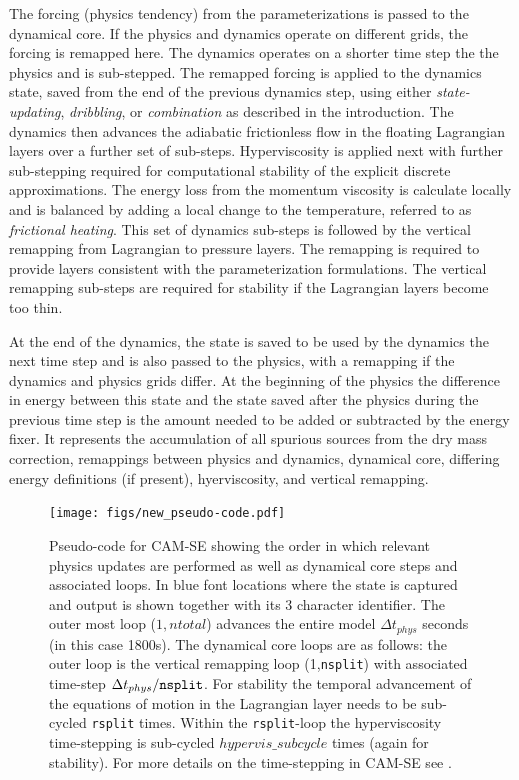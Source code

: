 \documentclass{agujournal}
\begin{document}
The forcing (physics tendency) from the parameterizations is passed to the dynamical core. If the physics and dynamics operate on different grids, the forcing is remapped here. The dynamics operates on a shorter time step the the physics and is sub-stepped. The remapped forcing is applied to the dynamics state, saved from the end of the previous dynamics step, using either {\em{state-updating}}, {\em{dribbling}}, or {\em{combination}} as described in the introduction. The dynamics then advances the adiabatic frictionless flow in the floating Lagrangian layers over a further set of sub-steps. Hyperviscosity is applied next with further sub-stepping required for computational stability of the explicit discrete approximations. The energy loss from the momentum viscosity is calculate locally and is balanced by adding a local change to the temperature, referred to as {\em{frictional heating}}. This set of dynamics sub-steps is followed by the vertical remapping from Lagrangian to pressure layers. The remapping is required to provide layers consistent with the parameterization formulations. The vertical remapping sub-steps are required for stability if the Lagrangian layers become too thin.

At the end of the dynamics, the state is saved to be used by the dynamics the next time step and is also passed to the physics, with a remapping if the dynamics and physics grids differ. At the beginning of the physics the difference in energy between this state and the state saved after the physics during the previous time step is the amount needed to be added or subtracted by the energy fixer. It represents the accumulation of all spurious sources from the dry mass correction, remappings between physics and dynamics, dynamical core, differing energy definitions (if present), hyerviscosity, and vertical remapping.



\begin{figure}[h]
\centering
 \texttt{[image: figs/new\_pseudo-code.pdf]}
\caption{Pseudo-code for CAM-SE showing the order in which relevant physics updates are performed as well as dynamical core steps and associated loops. In blue font locations where the state is captured and output is shown together with its 3 character identifier. The outer most loop ($1,ntotal$)  advances the entire model $\Delta t_{phys}$ seconds (in this case 1800s). The dynamical core loops are as follows: the outer loop is the vertical remapping loop (1,{\tt{nsplit}}) with associated time-step $\Delta t_{phys}/{\tt{nsplit}}$. For stability the temporal advancement of the equations of motion in the Lagrangian layer needs to be sub-cycled {\tt{rsplit}} times. Within the {\tt{rsplit}}-loop the hyperviscosity time-stepping is sub-cycled $hypervis\_subcycle$ times (again for stability). For more details on the time-stepping in CAM-SE see \citet{LetAl2018JAMES}.}
\label{fig:dAD}
\end{figure}
\end{document}
